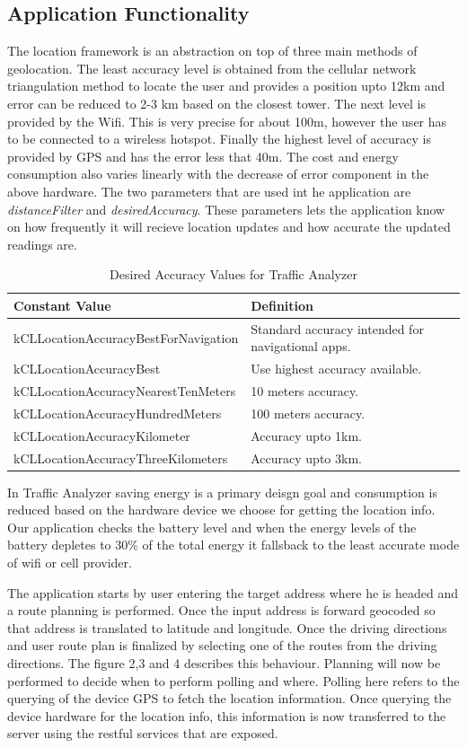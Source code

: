 \documentclass[10pt]{sigplan-proc-varsize}
\begin{document}
\subsection{Application Functionality}
The location framework is an abstraction on top of three main methods of geolocation. The least accuracy level is obtained from the cellular network triangulation method to locate the user and provides a position upto 12km and error can be reduced to 2-3 km based on the closest tower. The next level is provided by the Wifi. This is very precise for about 100m, however the user has to be connected to a wireless hotspot. Finally the highest level of accuracy is provided by GPS and has the error less that 40m. The cost and energy consumption also varies linearly with the decrease of error component in the above hardware. The two parameters that are used int he application are \textit{distanceFilter} and \textit{desiredAccuracy}. These parameters lets the application know on how frequently it will recieve location updates and how accurate the updated readings are.

\begin{table}[ht]
\caption{Desired Accuracy Values for Traffic Analyzer}
\centering
\begin{tabular}{l p{2cm}} \hline
Constant Value & Definition \\
\hline
kCLLocationAccuracyBestForNavigation & Standard accuracy intended for navigational apps. \\
kCLLocationAccuracyBest & Use highest accuracy available. \\
kCLLocationAccuracyNearestTenMeters & 10 meters accuracy. \\
kCLLocationAccuracyHundredMeters & 100 meters accuracy. \\
kCLLocationAccuracyKilometer & Accuracy upto 1km. \\
kCLLocationAccuracyThreeKilometers & Accuracy upto 3km. \\
\hline
\end{tabular}
\label{table:desaccuracy}
\end{table}

In Traffic Analyzer saving energy is a primary deisgn goal and consumption is reduced based on the hardware device we choose for getting the location info. Our application checks the battery level and when the energy levels of the battery depletes to 30\% of the total energy it fallsback to the least accurate mode of wifi or cell provider.

The application starts by user entering the target address where he is headed and a route planning is performed. Once the input address is forward geocoded so that address is translated to latitude and longitude. Once the driving directions and user route plan is finalized by selecting  one of the routes from the driving directions. The figure 2,3 and 4 describes this behaviour. Planning will now be performed to decide when to perform polling and where. Polling here refers to the querying of the device GPS to fetch the location information. Once querying the device hardware for the location info, this information is now transferred to the server using the restful services that are exposed.
\end{document}
